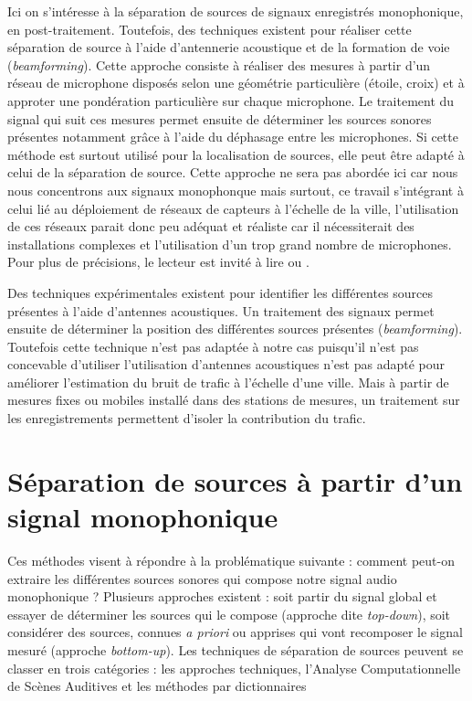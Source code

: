 Ici on s'intéresse à la séparation de sources de signaux enregistrés monophonique, en post-traitement. Toutefois, des techniques existent pour réaliser cette séparation de source à l'aide d'antennerie acoustique et de la formation de voie (\textit{beamforming}). Cette approche consiste à réaliser des mesures à partir d'un réseau de microphone disposés selon une géométrie particulière (étoile, croix) et à approter une pondération particulière sur chaque microphone. Le traitement du signal qui suit ces mesures permet ensuite de déterminer les sources sonores présentes notamment grâce à l'aide du déphasage entre les microphones. Si cette méthode est surtout utilisé pour la localisation de sources, elle peut être adapté à celui de la séparation de source. Cette approche ne sera pas abordée ici car nous nous concentrons aux signaux monophonque mais surtout, ce travail s'intégrant à celui lié au déploiement de réseaux de capteurs à l'échelle de la ville, l'utilisation de ces réseaux parait donc peu adéquat et réaliste car il nécessiterait des installations complexes et l'utilisation d'un trop grand nombre de microphones. Pour plus de précisions, le lecteur est invité à lire \cite{cardoso_blind_1998} ou \cite{godara_application_1997}. 


Des techniques expérimentales existent pour identifier les différentes sources présentes à l'aide d'antennes acoustiques. Un traitement des signaux permet ensuite de déterminer la position des différentes sources présentes (\textit{beamforming}). Toutefois cette technique n'est pas adaptée à notre cas puisqu'il n'est pas concevable d'utiliser l'utilisation d'antennes acoustiques n'est pas adapté pour améliorer l'estimation du bruit de trafic à l'échelle d'une ville.
Mais à partir de mesures fixes ou mobiles installé dans des stations de mesures, un traitement sur les enregistrements permettent d'isoler la contribution du trafic.


\section{Séparation de sources à partir d'un signal monophonique}

Ces méthodes visent à répondre à la problématique suivante : comment peut-on extraire les différentes sources sonores qui compose notre signal audio monophonique ? Plusieurs approches existent : soit partir du signal global et essayer de déterminer les sources qui le compose (approche dite \textit{top-down}), soit considérer des sources, connues \textit{a priori} ou apprises qui vont recomposer le signal mesuré (approche \textit{bottom-up}).
Les techniques de séparation de sources peuvent se classer en trois catégories : les approches techniques, l'Analyse Computationnelle de Scènes Auditives et les méthodes par dictionnaires

